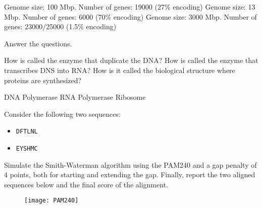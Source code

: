 \begin{Answer} [
  ref={ex2},
  number={2}
 ]

  \Question Genome size: 100 Mbp. Number of genes: 19000 (27\% encoding)
  \Question Genome size: 13 Mbp. Number of genes: 6000 (70\% encoding)
  \Question Genome size: 3000 Mbp. Number of genes: 23000/25000 (1.5\% encoding)

\end{Answer}

\begin{Exercise} [
  title={Enzyme},
  difficulty={1},
  label={ex3},
  origin={G. Valle}
 ]

  Answer the questions.

  \Question How is called the enzyme that duplicate the DNA?
  \Question How is called the enzyme that transcribes DNS into RNA?
  \Question How is it called the biological structure where proteins are
synthesized?
\end{Exercise}

\begin{Answer} [
  ref={ex3},
  number={3}
 ]

  \Question DNA Polymerase
  \Question RNA Polymerase
  \Question Ribosome
\end{Answer}

\begin{Exercise} [
  title={Smith and Waterman algorithm},
  difficulty={1},
  label={exSW},
  origin={G. Valle}
 ]

 Consider the following two sequences:

 \begin{itemize}
  \item \texttt{DFTLNL}
  \item \texttt{EYSHMC}
 \end{itemize}

 Simulate the Smith-Waterman algorithm using the PAM240 and a gap penalty of
 4 points, both for starting and extending the gap.
 Finally, report the two aligned sequences below and the final score of the
 alignment.

 \begin{figure}[H]
  \centering
  \texttt{[image: PAM240]}
 \end{figure}

\end{Exercise}

